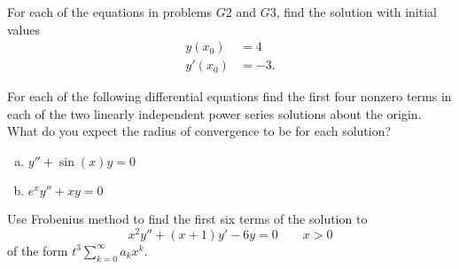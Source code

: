 \documentclass[12pt,letterpaper]{hmcpset}
\begin{document}
\begin{problem}[G4]
    For each of the equations in problems $G2$ and $G3$, find the solution with initial values
    \begin{align*}
        y(x_0) &= 4\\
        y'(x_0) &= -3.
    \end{align*}
\end{problem}

\begin{solution}
    \vfill
\end{solution}
\clearpage

\begin{problem}[G5]
    For each of the following differential equations find the first four nonzero terms in each of
    the two linearly independent power series solutions about the origin. What do you expect
    the radius of convergence to be for each solution?
    \begin{enumerate}[(a)]
        \item $y'' + \sin(x)y = 0$
        \item $e^xy'' + xy = 0$
    \end{enumerate}
\end{problem}

\begin{solution}
    \vfill
\end{solution}
\clearpage

\begin{problem}[G6]
    Use Frobenius method to find the first six terms of the solution to
    \[
        x^2y'' + (x+1)y' - 6y = 0 \qquad x > 0
    \]
    of the form $t^3\sum_{k=0}^\infty a_kx^k$.
\end{problem}

\begin{solution}
    \vfill
\end{solution}
\clearpage
\end{document}

